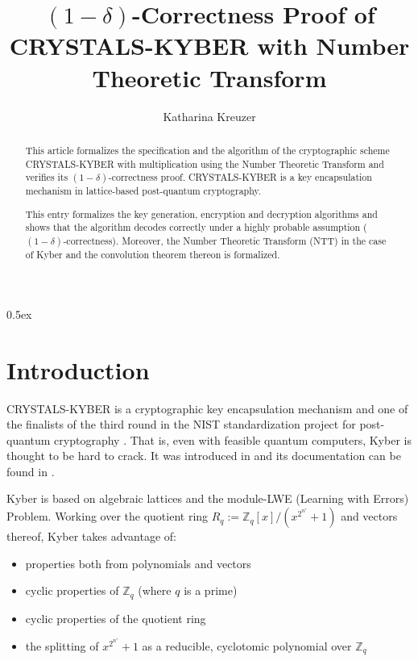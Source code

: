 \documentclass[11pt,a4paper]{article}
\begin{document}
\title{$(1-\delta)$-Correctness Proof of CRYSTALS-KYBER with Number Theoretic Transform}
\author{Katharina Kreuzer}
\maketitle

\begin{abstract}
This article formalizes the specification and the algorithm of the cryptographic scheme CRYSTALS-KYBER with multiplication using the Number Theoretic Transform and verifies its $(1-\delta)$-correctness proof. 
CRYSTALS-KYBER is a key encapsulation mechanism in lattice-based post-quantum cryptography. 

This entry formalizes the key generation, encryption and decryption algorithms and shows that the algorithm decodes correctly under a highly probable assumption ($(1-\delta)$-correctness). Moreover, the Number Theoretic Transform (NTT) in the case of Kyber and the convolution theorem thereon is formalized.
\end{abstract}


\newpage
\tableofcontents

\newpage
\parindent 0pt\parskip 0.5ex

\section{Introduction}
CRYSTALS-KYBER is a cryptographic key encapsulation mechanism and one of the finalists of the third round in the NIST standardization project for post-quantum cryptography \cite{report3rdroundNIST}. That is, even with feasible quantum computers, Kyber is thought to be hard to crack. It was introduced in \cite{kyber} and its documentation can be found in \cite{KyberAS}.

Kyber is based on algebraic lattices and the module-LWE (Learning with Errors) Problem. 
Working over the quotient ring $R_q := \mathbb{Z}_q[x]/(x^{2^{n'}}+1)$ and vectors thereof, Kyber takes advantage of:
\begin{itemize}
\item properties both from polynomials and vectors
\item cyclic properties of $\mathbb{Z}_q$ (where $q$ is a prime) 
\item cyclic properties of the quotient ring
\item the splitting of $x^{2^{n'}}+1$ as a reducible, cyclotomic polynomial over $\mathbb{Z}_q$
\end{itemize}
\end{document}
